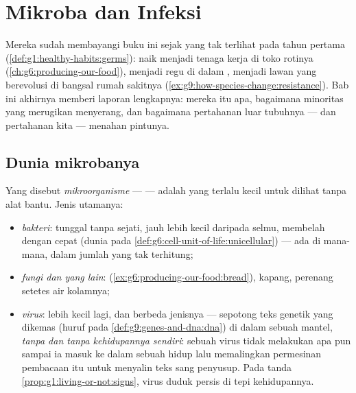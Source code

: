 \chapter{Mikroba dan Infeksi}\label{ch:g9:microbes-and-infection}

Mereka sudah membayangi buku ini sejak  yang tak
terlihat pada tahun pertama
(\cref{def:g1:healthy-habits:germs}): naik menjadi tenaga
kerja di toko rotinya (\cref{ch:g6:producing-our-food}),
menjadi regu  di dalam , menjadi lawan yang
berevolusi di bangsal rumah sakitnya
(\cref{ex:g9:how-species-change:resistance}). Bab ini
akhirnya memberi  laporan lengkapnya: mereka itu
apa, bagaimana minoritas yang merugikan menyerang, dan
bagaimana pertahanan luar tubuhnya --- dan pertahanan kita
--- menahan pintunya.

\section{Dunia mikrobanya}

\begin{definition}\label{def:g9:microbes-and-infection:sorted}
Yang disebut \emph{mikroorganisme} ---
 --- adalah  yang terlalu kecil untuk
dilihat tanpa alat bantu. Jenis utamanya:
\begin{itemize}
  \item \emph{bakteri}:  tunggal tanpa
         sejati, jauh lebih kecil daripada selmu,
        membelah dengan cepat (dunia pada
        \cref{def:g6:cell-unit-of-life:unicellular}) --- ada
        di mana-mana, dalam jumlah yang tak terhitung;
  \item \emph{fungi  dan yang lain}: 
        (\cref{ex:g6:producing-our-food:bread}), 
        kapang, perenang setetes air kolamnya;
  \item \emph{virus}: lebih kecil lagi, dan
        berbeda jenisnya --- sepotong teks genetik yang
        dikemas (huruf pada \cref{def:g9:genes-and-dna:dna})
        di dalam sebuah mantel, \emph{tanpa  dan tanpa
        kehidupannya sendiri}: sebuah virus tidak melakukan
        apa pun sampai ia masuk ke dalam sebuah  hidup
        lalu memalingkan permesinan pembacaan  itu untuk
        menyalin teks sang penyusup. Pada tanda
        \cref{prop:g1:living-or-not:signs}, virus duduk
        persis di tepi kehidupannya.
\end{itemize}
\end{definition}

